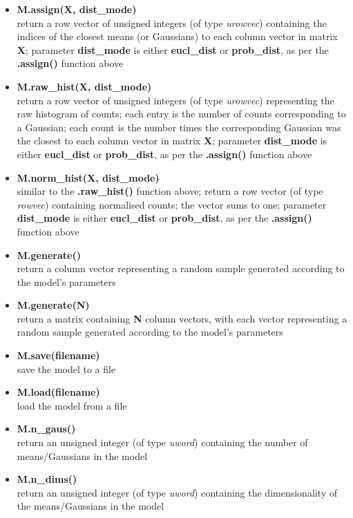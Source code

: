 \begin{small}
\begin{itemize}
\item
{\bf M.assign(X, dist\_mode)}\\
return a row vector of unsigned integers (of type {\it urowvec}) containing the indices of the closest means (or Gaussians) to each column vector in matrix {\bf X};
parameter {\bf dist\_mode} is either {\bf eucl\_dist} or {\bf prob\_dist}, as per the {\bf .assign()} function above

\item
{\bf M.raw\_hist(X, dist\_mode)}\\
return a row vector of unsigned integers (of type {\it urowvec}) representing the raw histogram of counts;
each entry is the number of counts corresponding to a Gaussian;
each count is the number times the corresponding Gaussian was the closest to each column vector in matrix {\bf X};
parameter {\bf dist\_mode} is either {\bf eucl\_dist} or {\bf prob\_dist}, as per the {\bf .assign()} function above

\item
{\bf M.norm\_hist(X, dist\_mode)}\\
similar to the {\bf .raw\_hist()} function above; return a row vector (of type {\it rowvec}) containing normalised counts; the vector sums to one;
parameter {\bf dist\_mode} is either {\bf eucl\_dist} or {\bf prob\_dist}, as per the {\bf .assign()} function above

\item
{\bf M.generate()}\\
return a column vector representing a random sample generated according to the model's parameters

\item
{\bf M.generate(N)}\\
return a matrix containing {\bf N} column vectors, with each vector representing a random sample generated according to the model's parameters

\item
{\bf M.save(filename)}\\
save the model to a file

\item
{\bf M.load(filename)}\\
load the model from a file

\item
{\bf M.n\_gaus()}\\
return an unsigned integer (of type {\it uword}) containing the number of means/Gaussians in the model

\item
{\bf M.n\_dims()}\\
return an unsigned integer (of type {\it uword}) containing the dimensionality of the means/Gaussians in the model


\end{itemize}
\end{small}
